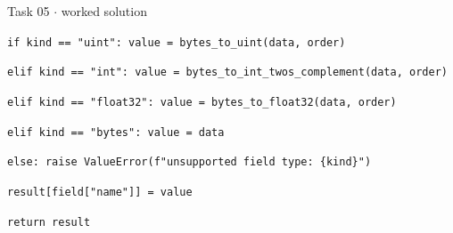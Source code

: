 \documentclass[11pt]{article}
\begin{document}
\begin{keepsection}
\begin{workedbox}{Task 05 \ensuremath{\cdot} worked solution}
\begin{enumerate}
\begin{tcolorbox}[colback=Paperblue,colframe=Paperblue,boxrule=0pt,arc=0pt,left=7pt,right=7pt,top=5pt,bottom=5pt]
\noindent\hspace*{3em}\texttt{if kind == "uint": value = bytes\_to\_uint(data, order)}\par
\noindent\hspace*{3em}\texttt{elif kind == "int": value = bytes\_to\_int\_twos\_complement(data, order)}\par
\noindent\hspace*{3em}\texttt{elif kind == "float32": value = bytes\_to\_float32(data, order)}\par
\noindent\hspace*{3em}\texttt{elif kind == "bytes": value = data}\par
\noindent\hspace*{3em}\texttt{else: raise ValueError(f"unsupported field type: \{kind\}")}\par
\noindent\hspace*{3em}\texttt{result[field["name"]] = value}\par
\noindent\hspace*{1em}\texttt{return result}\par
\end{tcolorbox}
\end{enumerate}
\end{workedbox}

\end{keepsection}
\end{document}

